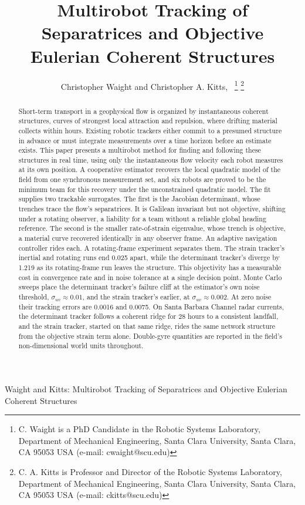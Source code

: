 \documentclass[lettersize,journal]{IEEEtran}
\begin{document}
\title{Multirobot Tracking of Separatrices and
Objective Eulerian Coherent Structures}

\author{Christopher Waight and Christopher A. Kitts,~
\thanks{C. Waight is a PhD Candidate in the Robotic Systems Laboratory, Department of Mechanical Engineering, Santa Clara University, Santa Clara, CA 95053 USA (e-mail: cwaight@scu.edu)}
\thanks{C. A. Kitts is Professor and Director of the Robotic Systems Laboratory, Department of Mechanical Engineering, Santa Clara University, Santa Clara, CA 95053 USA (e-mail: ckitts@scu.edu)}
}
%
{Waight and Kitts: Multirobot Tracking of Separatrices and Objective Eulerian Coherent Structures}

\maketitle

\begin{abstract}
Short-term transport in a geophysical flow is organized by
instantaneous coherent structures, curves of strongest local attraction
and repulsion, where drifting material collects within hours. Existing
robotic trackers either commit to a presumed structure in advance or
must integrate measurements over a time horizon before an estimate
exists. This paper presents a multirobot method for finding and
following these structures in real time, using only the instantaneous flow velocity
each robot measures at its own position. A cooperative estimator
recovers the local quadratic model of the field from one synchronous
measurement set, and six robots are proved to be the minimum team for
this recovery under the unconstrained quadratic model. The fit supplies two trackable surrogates. The first is the Jacobian
determinant, whose trenches trace the flow's separatrices. It is
Galilean invariant but not objective, shifting under a rotating observer, a liability for a team without a reliable global heading reference.
The second is the smaller rate-of-strain eigenvalue, whose trench is
objective, a material curve recovered identically in any observer frame.
An adaptive navigation controller rides each. A rotating-frame experiment
separates them. The strain tracker's inertial and rotating runs end
0.025 apart, while the determinant tracker's diverge by 1.219 as its
rotating-frame run leaves the structure. This objectivity has a
measurable cost in convergence rate and in noise tolerance at a single
decision point. Monte Carlo sweeps place the determinant
tracker's failure cliff at the estimator's own noise threshold,
$\sigma_{uv} \approx 0.01$, and the strain tracker's earlier, at
$\sigma_{uv} \approx 0.002$. At zero noise their tracking errors are
0.0016 and 0.0075. On Santa Barbara Channel radar currents, the
determinant tracker follows a coherent ridge for 28 hours to a consistent
landfall, and the strain tracker, started on that same ridge, rides the
same network structure from the objective strain term alone. Double-gyre
quantities are reported in the field's non-dimensional world units
throughout.
\end{abstract}
\end{document}
